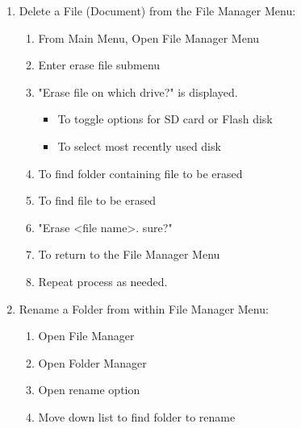 \documentclass[10pt,letterpaper,twoside]{report}
\begin{document}
\begin{enumerate}
\begin{enumerate}
	      \end{enumerate}
	\item Delete a File (Document) from the File Manager Menu:
	      \begin{enumerate}
		      \item From Main Menu, Open File Manager Menu 
		      \item Enter erase file submenu 
		      \item "Erase file on which drive?" is displayed.
		            \begin{itemize}
			            \item To toggle options for SD card or Flash disk 
			            \item To select most recently used disk 
		            \end{itemize}
		      \item To find folder containing file to be erased 
		      \item To find file to be erased 
		      \item "Erase <file name>. sure?" 
		      \item To return to the File Manager Menu 
		      \item Repeat process as needed.
	      \end{enumerate}
	\item Rename a Folder from within File Manager Menu:
	      \begin{enumerate}
		      \item Open File Manager 
		      \item Open Folder Manager 
		      \item Open rename option 
		      \item Move down list to find folder to rename 

\end{enumerate}
\end{enumerate}
\end{document}
